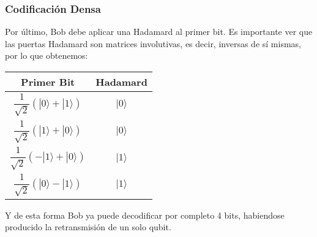 \documentclass{beamer}
\newcommand{\base}[1]{|#1\rangle}
\begin{document}
\begin{frame}
	\frametitle{Codificación Densa}
	Por último, Bob debe aplicar una Hadamard al primer bit. Es importante ver que las puertas Hadamard son matrices involutivas, es decir, inversas de sí mismas, por lo que obtenemos:
		\begin{center}
 		\begin{tabular}{||c c||} 
 		\hline
 		Primer Bit & Hadamard \\ [0.8ex] 
	 	\hline\hline
 		$\dfrac{1}{\sqrt{2}}(\base0 + \base1)$ & $\base0$ \\ 
 		\hline
		$\dfrac{1}{\sqrt{2}}(\base1 + \base0)$ & $\base0$ \\
 		\hline
		$\dfrac{1}{\sqrt{2}}(-\base1 + \base0)$ & $\base1$ \\
	 	\hline
	 	$\dfrac{1}{\sqrt{2}}(\base0 - \base1)$ & $\base1$ \\[1ex]
	 	\hline
		\end{tabular}
	\end{center}
	Y de esta forma Bob ya puede decodificar por completo 4 bits, habiendose producido la retransmisión de un solo qubit.
\end{frame}
\end{document}
